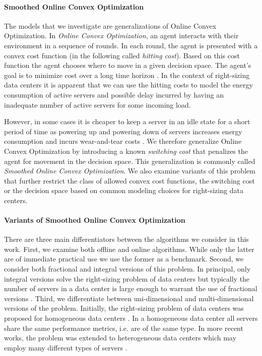 \paragraph{Smoothed Online Convex Optimization} The models that we investigate are generalizations of Online Convex Optimization. In \textit{Online Convex Optimization}, an agent interacts with their environment in a sequence of rounds. In each round, the agent is presented with a convex cost function (in the following called \textit{hitting cost}). Based on this cost function the agent chooses where to move in a given decision space. The agent's goal is to minimize cost over a long time horizon \cite{Hazan2019}. In the context of right-sizing data centers it is apparent that we can use the hitting costs to model the energy consumption of active servers and possible delay incurred by having an inadequate number of active servers for some incoming load.

However, in some cases it is cheaper to keep a server in an idle state for a short period of time as powering up and powering down of servers increases energy consumption and incurs wear-and-tear costs \cite{Lin2011}. We therefore generalize Online Convex Optimization by introducing a known \textit{switching cost} that penalizes the agent for movement in the decision space. This generalization is commonly called \textit{Smoothed Online Convex Optimization}. We also examine variants of this problem that further restrict the class of allowed convex cost functions, the switching cost or the decision space based on common modeling choices for right-sizing data centers.

\paragraph{Variants of Smoothed Online Convex Optimization} There are three main differentiators between the algorithms we consider in this work. First, we examine both offline and online algorithms. While only the latter are of immediate practical use we use the former as a benchmark. Second, we consider both fractional and integral versions of this problem. In principal, only integral versions solve the right-sizing problem of data centers but typically the number of servers in a data center is large enough to warrant the use of fractional versions \cite{Bansal2015}. Third, we differentiate between uni-dimensional and multi-dimensional versions of the problem. Initially, the right-sizing problem of data centers was proposed for homogeneous data centers \cite{Lin2011, Bansal2015, Albers2018}. In a homogeneous data center all servers share the same performance metrics, i.e. are of the same type. In more recent works, the problem was extended to heterogeneous data centers which may employ many different types of servers \cite{Lin2012, Chen2018, Goel2019, Albers2021, Albers2021_2}.

